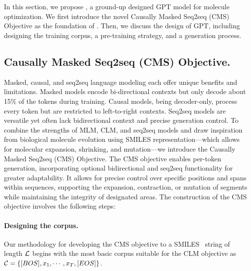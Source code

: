 

\section{\algname}

In this section, we propose \algname, a ground-up designed GPT model for molecule optimization. We first introduce the novel Causally Masked Seq2seq (CMS) Objective as the foundation of \algname. Then, we discuss the design of GPT, including designing the training corpus, a pre-training strategy, and a generation process.


\subsection{Causally Masked Seq2seq (CMS) Objective.}\label{sec:cm_obj}

Masked, causal, and seq2seq language modeling each offer unique benefits and limitations. Masked models encode bi-directional contexts but only decode about 15\% of the tokens during training. Causal models, being decoder-only, process every token but are restricted to left-to-right contexts. Seq2seq models are versatile yet often lack bidirectional context and precise generation control. To combine the strengths of MLM, CLM, and seq2seq models and draw inspiration from biological molecule evolution using SMILES representation—which allows for molecular expansion, shrinking, and mutation—we introduce the Causally Masked Seq2seq (CMS) Objective.
The CMS objective enables per-token generation, incorporating optional bidirectional and seq2seq functionality for greater adaptability. It allows for precise control over specific positions and spans within sequences, supporting the expansion, contraction, or mutation of segments while maintaining the integrity of designated areas. The construction of the CMS objective involves the following steps:







\paragraph{Designing the corpus.} Our methodology for developing the CMS objective to a SMILES~\citep{weininger1988smiles} string of length $\mathcal{L}$ begins with the most basic corpus suitable for the CLM objective as
$\mathcal{C}=\left\{[BOS],{x_1,\cdots,x_{T}},[EOS]\right\}$.
